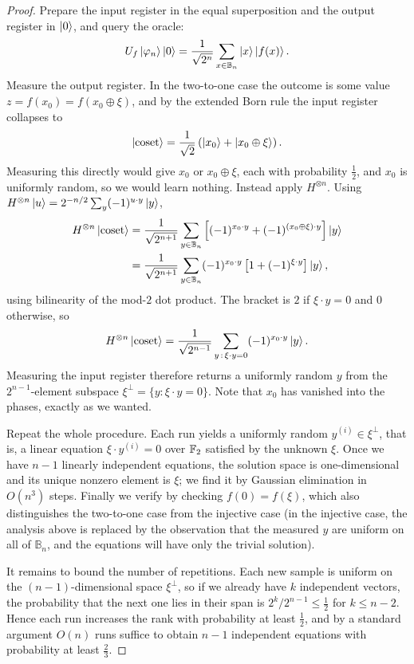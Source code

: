 \documentclass[a4paper]{scrartcl}
\newcommand{\bits}[1]{\mathbb{B}_{#1}}
\begin{document}
\begin{proof}
	Prepare the input register in the equal superposition and the output register in $\ket{0}$, and query the oracle:
	$$U_f\ket{\varphi_n}\ket0 = \frac1{\sqrt{2^n}}\sum_{x\in\bits n}\ket x\ket{f(x)}.$$
	Measure the output register. In the two-to-one case the outcome is some value $z = f(x_0) = f(x_0\oplus\xi)$, and by the extended Born rule the input register collapses to
	$$\ket{\text{coset}} = \frac{1}{\sqrt2}\left(\ket{x_0}+\ket{x_0\oplus\xi}\right).$$
	Measuring this directly would give $x_0$ or $x_0\oplus\xi$, each with probability $\tfrac12$, and $x_0$ is uniformly random, so we would learn nothing. Instead apply $H^{\otimes n}$. Using $H^{\otimes n}\ket u = 2^{-n/2}\sum_y(-1)^{u\cdot y}\ket y$,
	\begin{align*}
		H^{\otimes n}\ket{\text{coset}} &= \frac1{\sqrt{2^{n+1}}}\sum_{y\in\bits n}\left[(-1)^{x_0\cdot y} + (-1)^{(x_0\oplus\xi)\cdot y}\right]\ket y\\
		&= \frac{1}{\sqrt{2^{n+1}}}\sum_{y\in\bits n}(-1)^{x_0\cdot y}\left[1+(-1)^{\xi\cdot y}\right]\ket y,
	\end{align*}
	using bilinearity of the mod-$2$ dot product. The bracket is $2$ if $\xi\cdot y = 0$ and $0$ otherwise, so
	$$H^{\otimes n}\ket{\text{coset}} = \frac{1}{\sqrt{2^{n-1}}}\sum_{y\,:\,\xi\cdot y = 0}(-1)^{x_0\cdot y}\ket y.$$
	Measuring the input register therefore returns a uniformly random $y$ from the $2^{n-1}$-element subspace $\xi^\perp = \{y : \xi\cdot y = 0\}$. Note that $x_0$ has vanished into the phases, exactly as we wanted.

	Repeat the whole procedure. Each run yields a uniformly random $y^{(i)}\in\xi^\perp$, that is, a linear equation $\xi\cdot y^{(i)} = 0$ over $\mathbb{F}_2$ satisfied by the unknown $\xi$. Once we have $n-1$ linearly independent equations, the solution space is one-dimensional and its unique nonzero element is $\xi$; we find it by Gaussian elimination in $O(n^3)$ steps. Finally we verify by checking $f(0) = f(\xi)$, which also distinguishes the two-to-one case from the injective case (in the injective case, the analysis above is replaced by the observation that the measured $y$ are uniform on all of $\bits n$, and the equations will have only the trivial solution).

	It remains to bound the number of repetitions. Each new sample is uniform on the $(n-1)$-dimensional space $\xi^\perp$, so if we already have $k$ independent vectors, the probability that the next one lies in their span is $2^{k}/2^{n-1}\leq\tfrac12$ for $k \le n-2$. Hence each run increases the rank with probability at least $\tfrac12$, and by a standard argument $O(n)$ runs suffice to obtain $n-1$ independent equations with probability at least $\tfrac23$.
\end{proof}
\end{document}
